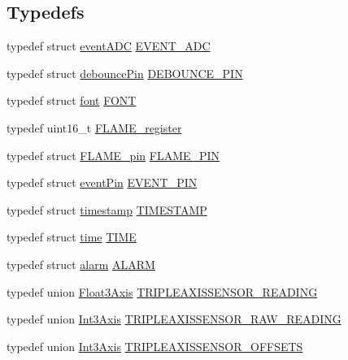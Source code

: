 \subsection*{Typedefs}
\begin{DoxyCompactItemize}
\item 
typedef struct \hyperlink{structflame_1_1event_a_d_c}{event\-A\-D\-C} \hyperlink{namespaceflame_a0fb9cd960c9db48d9e068daa2427aecf}{E\-V\-E\-N\-T\-\_\-\-A\-D\-C}
\item 
typedef struct \hyperlink{structflame_1_1debounce_pin}{debounce\-Pin} \hyperlink{namespaceflame_a1909d0b4150ee5ef201afa40b431b811}{D\-E\-B\-O\-U\-N\-C\-E\-\_\-\-P\-I\-N}
\item 
typedef struct \hyperlink{structflame_1_1font}{font} \hyperlink{namespaceflame_a05350b61d7b7be486d5e367522316a33}{F\-O\-N\-T}
\item 
typedef uint16\-\_\-t \hyperlink{namespaceflame_a7117d3cded694c1ded03c462d677b165}{F\-L\-A\-M\-E\-\_\-register}
\item 
typedef struct \hyperlink{structflame_1_1_f_l_a_m_e__pin}{F\-L\-A\-M\-E\-\_\-pin} \hyperlink{namespaceflame_ae345f4de995f89125721dd4f5cd4cd9f}{F\-L\-A\-M\-E\-\_\-\-P\-I\-N}
\item 
typedef struct \hyperlink{structflame_1_1event_pin}{event\-Pin} \hyperlink{namespaceflame_a2f4f205987821e931681b9ed5ca0eaf2}{E\-V\-E\-N\-T\-\_\-\-P\-I\-N}
\item 
typedef struct \hyperlink{structflame_1_1timestamp}{timestamp} \hyperlink{namespaceflame_ad90347e9ea7e54907966260ec5c7d22f}{T\-I\-M\-E\-S\-T\-A\-M\-P}
\item 
typedef struct \hyperlink{structflame_1_1time}{time} \hyperlink{namespaceflame_a961fbb5da27b8d64aa0dfc18f55b2be6}{T\-I\-M\-E}
\item 
typedef struct \hyperlink{structflame_1_1alarm}{alarm} \hyperlink{namespaceflame_a7a5a7b0bdd1b44d7d0b0a600552b5ab5}{A\-L\-A\-R\-M}
\item 
typedef union \hyperlink{unionflame_1_1_float3_axis}{Float3\-Axis} \hyperlink{namespaceflame_a11b86dc8b6fd50d24cec8b9f0259289b}{T\-R\-I\-P\-L\-E\-A\-X\-I\-S\-S\-E\-N\-S\-O\-R\-\_\-\-R\-E\-A\-D\-I\-N\-G}
\item 
typedef union \hyperlink{unionflame_1_1_int3_axis}{Int3\-Axis} \hyperlink{namespaceflame_ab883ad815041824ba548753dae327bc2}{T\-R\-I\-P\-L\-E\-A\-X\-I\-S\-S\-E\-N\-S\-O\-R\-\_\-\-R\-A\-W\-\_\-\-R\-E\-A\-D\-I\-N\-G}
\item 
typedef union \hyperlink{unionflame_1_1_int3_axis}{Int3\-Axis} \hyperlink{namespaceflame_a9c63ea08dcbcedfed611f6afdb992301}{T\-R\-I\-P\-L\-E\-A\-X\-I\-S\-S\-E\-N\-S\-O\-R\-\_\-\-O\-F\-F\-S\-E\-T\-S}

\end{DoxyCompactItemize}
